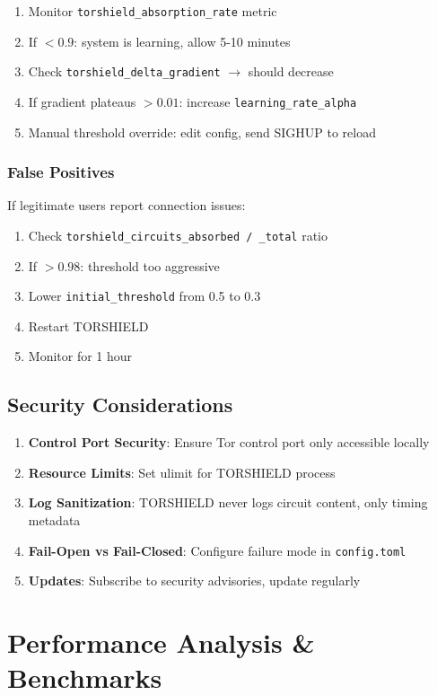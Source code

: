\documentclass[11pt,a4paper]{article}
\begin{document}
\begin{enumerate}
\item Monitor \texttt{torshield\_absorption\_rate} metric
\item If $< 0.9$: system is learning, allow 5-10 minutes
\item Check \texttt{torshield\_delta\_gradient} $\to$ should decrease
\item If gradient plateaus $> 0.01$: increase \texttt{learning\_rate\_alpha}
\item Manual threshold override: edit config, send SIGHUP to reload
\end{enumerate}

\subsubsection{False Positives}

If legitimate users report connection issues:
\begin{enumerate}
\item Check \texttt{torshield\_circuits\_absorbed / \_total} ratio
\item If $> 0.98$: threshold too aggressive
\item Lower \texttt{initial\_threshold} from 0.5 to 0.3
\item Restart TORSHIELD
\item Monitor for 1 hour
\end{enumerate}

\subsection{Security Considerations}

\begin{enumerate}
\item \textbf{Control Port Security}: Ensure Tor control port only accessible locally
\item \textbf{Resource Limits}: Set ulimit for TORSHIELD process
\item \textbf{Log Sanitization}: TORSHIELD never logs circuit content, only timing metadata
\item \textbf{Fail-Open vs Fail-Closed}: Configure failure mode in \texttt{config.toml}
\item \textbf{Updates}: Subscribe to security advisories, update regularly
\end{enumerate}

\newpage
\section{Performance Analysis \& Benchmarks}
\end{document}

